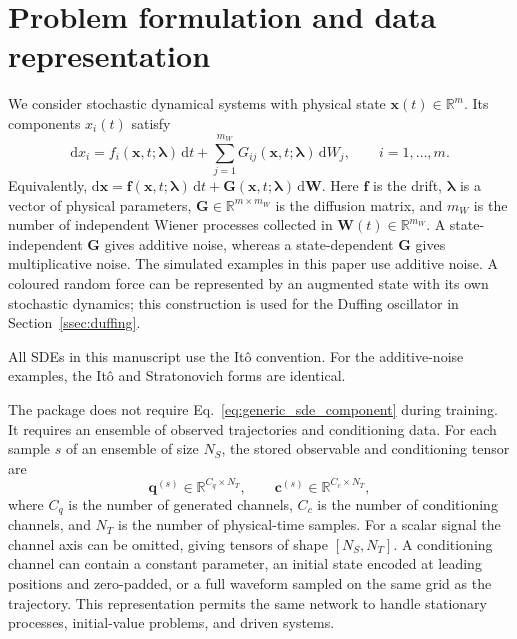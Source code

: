 
\section{Problem formulation and data representation}
\label{sec:physical_problem}

We consider stochastic dynamical systems with physical state
$\mathbf{x}(t)\in\mathbb{R}^m$. Its components $x_i(t)$ satisfy
\begin{equation}
    \mathrm{d}x_i
    =
    f_i(\mathbf{x},t;\boldsymbol{\lambda})\,\mathrm{d}t
    +
    \sum_{j=1}^{m_W}
    G_{ij}(\mathbf{x},t;\boldsymbol{\lambda})\,\mathrm{d}W_j,
    \qquad i=1,\ldots,m .
    \label{eq:generic_sde_component}
\end{equation}
Equivalently, $\mathrm{d}\mathbf{x}=\mathbf{f}(\mathbf{x},t;
\boldsymbol{\lambda})\,\mathrm{d}t+\mathbf{G}(\mathbf{x},t;
\boldsymbol{\lambda})\,\mathrm{d}\mathbf{W}$. Here $\mathbf{f}$ is the
drift, $\boldsymbol{\lambda}$ is a vector of physical parameters,
$\mathbf{G}\in\mathbb{R}^{m\times m_W}$ is the diffusion matrix, and $m_W$ is
the number of independent Wiener processes collected in
$\mathbf{W}(t)\in\mathbb{R}^{m_W}$. A state-independent
$\mathbf{G}$ gives additive noise, whereas a state-dependent $\mathbf{G}$
gives multiplicative noise. The simulated examples in this paper use additive
noise. A coloured random force can be represented by an augmented state with its
own stochastic dynamics; this construction is used for the Duffing oscillator in
Section~\ref{ssec:duffing}.

All SDEs in this manuscript use the It\^o convention. For the additive-noise
examples, the It\^o and Stratonovich forms are identical.

The package does not require Eq.~\eqref{eq:generic_sde_component} during
training. It requires an ensemble of observed trajectories and conditioning data.
For each sample $s$ of an ensemble of size $N_S$, the stored observable and
conditioning tensor are
\begin{equation}
    \mathbf{q}^{(s)}\in\mathbb{R}^{C_q\times N_T},
    \qquad
    \mathbf{c}^{(s)}\in\mathbb{R}^{C_c\times N_T},
    \label{eq:trajectory_conditioning_tensors}
\end{equation}
where $C_q$ is the number of generated channels, $C_c$ is the number of
conditioning channels, and $N_T$ is the number of physical-time samples. For a
scalar signal the channel axis can be omitted, giving tensors of shape
$[N_S,N_T]$. A conditioning channel can contain a constant parameter, an initial
state encoded at leading positions and zero-padded, or a full waveform sampled on
the same grid as the trajectory. This representation permits the same network to
handle stationary processes, initial-value problems, and driven systems.

